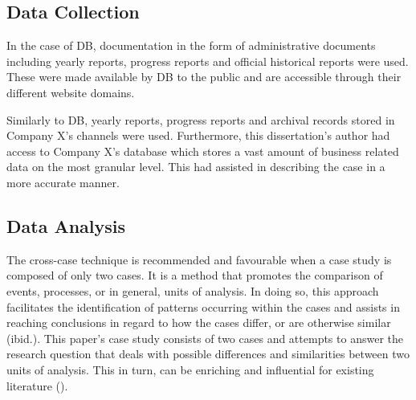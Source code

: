 \documentclass[11pt,a4paper]{article}
\begin{document}
{{\vspace{-2mm}

\subsection{Data Collection}
\label{data_collec}
\vspace{-1mm}
 \par
In the case of DB, documentation in the form of administrative documents including yearly reports, progress reports and official historical reports were used. These were made available by DB to the public and are accessible through their different website domains. \par
Similarly to DB, yearly reports, progress reports and archival records stored in Company X's channels were used. Furthermore, this dissertation's author had access to Company X's database which stores a vast amount of business related data on the most granular level. This had assisted in describing the case in a more accurate manner.
\vspace{-3mm}
\subsection{Data Analysis}
\label{data_ana}
\vspace{-1mm}
 \par
The cross-case technique is recommended and favourable when a case study is composed of only two cases. It is a method that promotes the comparison of events, processes, or in general, units of analysis. In doing so, this approach facilitates the identification of patterns occurring within the cases and assists in reaching conclusions in regard to how the cases differ, or are otherwise similar (ibid.). This paper's case study consists of two cases and attempts to answer the research question that deals with possible differences and similarities between two units of analysis. This in turn, can be enriching and influential for existing literature (\cite{gustafssonSingleCaseStudies2017}). \par

}}
\end{document}
